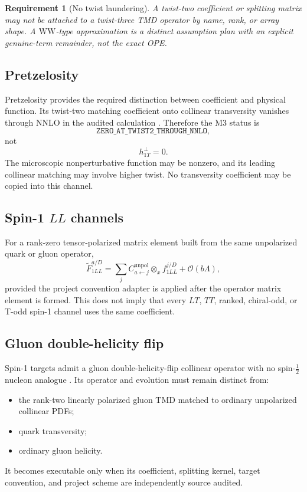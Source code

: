 \documentclass[11pt]{article}
\newtheorem{requirement}[definition]{Requirement}
\newcommand{\otimesx}{\mathbin{\otimes_x}}
\newcommand{\order}{\mathcal O}
\newcommand{\WW}{\mathrm{WW}}
\begin{document}
\begin{requirement}[No twist laundering]
A twist-two coefficient or splitting matrix may not be attached to a twist-three TMD operator by name, rank, or array shape.  A \(\WW\)-type approximation is a distinct assumption plan with an explicit genuine-term remainder, not the exact OPE.
\end{requirement}

\subsection{Pretzelosity}

Pretzelosity provides the required distinction between coefficient and physical function.  Its twist-two matching coefficient onto collinear transversity vanishes through NNLO in the audited calculation \cite{GutierrezReyesScimemiVladimirov2018}.  Therefore the M3 status is
\begin{equation}
 \texttt{ZERO\_AT\_TWIST2\_THROUGH\_NNLO},
 \label{eq:pretzelosity-status}
\end{equation}
not
\begin{equation}
 h_{1T}^{\perp}=0.
\end{equation}
The microscopic nonperturbative function may be nonzero, and its leading collinear matching may involve higher twist.  No transversity coefficient may be copied into this channel.

\subsection{Spin-1 \texorpdfstring{\(LL\)}{LL} channels}

For a rank-zero tensor-polarized matrix element built from the same unpolarized quark or gluon operator,
\begin{equation}
 \widetilde F_{1LL}^{a/D}
 =
 \sum_j C_{a\leftarrow j}^{\mathrm{unpol}}
 \otimesx
 f_{1LL}^{j/D}
 +\order(b\Lambda),
 \label{eq:ll-universality}
\end{equation}
provided the project convention adapter is applied after the operator matrix element is formed.  This does not imply that every \(LT\), \(TT\), ranked, chiral-odd, or T-odd spin-1 channel uses the same coefficient.

\subsection{Gluon double-helicity flip}

Spin-1 targets admit a gluon double-helicity-flip collinear operator with no spin-\(\tfrac12\) nucleon analogue \cite{KumanoSong2022}.  Its operator and evolution must remain distinct from:
\begin{itemize}
\item the rank-two linearly polarized gluon TMD matched to ordinary unpolarized collinear PDFs;
\item quark transversity;
\item ordinary gluon helicity.
\end{itemize}
It becomes executable only when its coefficient, splitting kernel, target convention, and project scheme are independently source audited.
\end{document}
